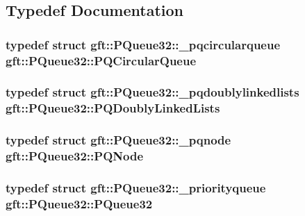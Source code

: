\subsection{Typedef Documentation}
\hypertarget{namespacegft_1_1PQueue32_aefaf7157b45d644a8eed22d16d5ae865}{
\subsubsection[{P\-Q\-Circular\-Queue}]{\setlength{\rightskip}{0pt plus 5cm}typedef struct {\bf gft\-::\-P\-Queue32\-::\-\_\-pqcircularqueue}  {\bf gft\-::\-P\-Queue32\-::\-P\-Q\-Circular\-Queue}}}\label{namespacegft_1_1PQueue32_aefaf7157b45d644a8eed22d16d5ae865}
\hypertarget{namespacegft_1_1PQueue32_a0f1b06428dba7567e75fedd80ecadc05}{
\subsubsection[{P\-Q\-Doubly\-Linked\-Lists}]{\setlength{\rightskip}{0pt plus 5cm}typedef struct {\bf gft\-::\-P\-Queue32\-::\-\_\-pqdoublylinkedlists}  {\bf gft\-::\-P\-Queue32\-::\-P\-Q\-Doubly\-Linked\-Lists}}}\label{namespacegft_1_1PQueue32_a0f1b06428dba7567e75fedd80ecadc05}
\hypertarget{namespacegft_1_1PQueue32_ae52de18ce37cbf998885ae2ea5843494}{
\subsubsection[{P\-Q\-Node}]{\setlength{\rightskip}{0pt plus 5cm}typedef struct {\bf gft\-::\-P\-Queue32\-::\-\_\-pqnode}  {\bf gft\-::\-P\-Queue32\-::\-P\-Q\-Node}}}\label{namespacegft_1_1PQueue32_ae52de18ce37cbf998885ae2ea5843494}
\hypertarget{namespacegft_1_1PQueue32_a27686e3155a7097ff40a4e88958bb50e}{
\subsubsection[{P\-Queue32}]{\setlength{\rightskip}{0pt plus 5cm}typedef struct {\bf gft\-::\-P\-Queue32\-::\-\_\-priorityqueue}  {\bf gft\-::\-P\-Queue32\-::\-P\-Queue32}}}\label{namespacegft_1_1PQueue32_a27686e3155a7097ff40a4e88958bb50e}


